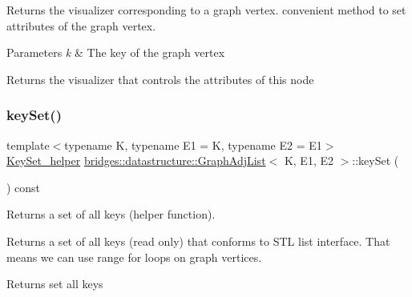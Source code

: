 Returns the visualizer corresponding to a graph vertex. convenient method to set attributes of the graph vertex. 


\begin{DoxyParams}{Parameters}
{\em k} & The key of the graph vertex\\
\hline
\end{DoxyParams}
\begin{DoxyReturn}{Returns}
the visualizer that controls the attributes of this node 
\end{DoxyReturn}
\mbox{\label{classbridges_1_1datastructure_1_1_graph_adj_list_a0562e8d82499f26ad656a1dfb5f8908e}} 
\subsubsection{\texorpdfstring{key\+Set()}{keySet()}}
{\footnotesize\ttfamily template$<$typename K, typename E1 = K, typename E2 = E1$>$ \\
\hyperlink{classbridges_1_1datastructure_1_1_graph_adj_list_1_1_key_set__helper}{Key\+Set\+\_\+helper} \hyperlink{classbridges_1_1datastructure_1_1_graph_adj_list}{bridges\+::datastructure\+::\+Graph\+Adj\+List}$<$ K, E1, E2 $>$\+::key\+Set (\begin{DoxyParamCaption}{ }\end{DoxyParamCaption}) const\hspace{0.3cm}{\ttfamily [inline]}}

Returns a set of all keys (helper function).

Returns a set of all keys (read only) that conforms to S\+TL list interface. That means we can use range for loops on graph vertices.

\begin{DoxyReturn}{Returns}
set all keys 
\end{DoxyReturn}
\mbox{\label{classbridges_1_1datastructure_1_1_graph_adj_list_ac066da800ab88dc2e55a89650e08bb78}} 

